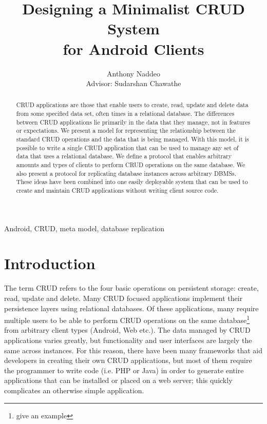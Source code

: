 \documentclass[journal]{IEEEtran}
\begin{document}
\title{Designing a Minimalist CRUD System\\ for Android Clients}
\author{Anthony Naddeo \\ Advisor: Sudarshan Chawathe}

\maketitle


\begin{abstract}
CRUD applications are those that enable users to create, read, update and delete data from some specified data set, often times in a relational database. The differences between CRUD applications lie primarily in the data that they manage, not in features or expectations. We present a model for representing the relationship between the standard CRUD operations and the data that is being managed. With this model, it is possible to write a single CRUD application that can be used to manage any set of data that uses a relational database. We define a protocol that enables arbitrary amounts and types of clients to perform CRUD operations on the same database. We also present a protocol for replicating database instances across arbitrary DBMSs. These ideas have been combined into one easily deployable system that can be used to create and maintain CRUD applications without writing client source code.
\end{abstract}

\begin{IEEEkeywords}
Android, CRUD, meta model, database replication
\end{IEEEkeywords}

\IEEEpeerreviewmaketitle
\tableofcontents

\section{Introduction} \label{sec:intro}



The term CRUD refers to the four basic operations on persistent storage: create, read, update and delete. Many CRUD focused applications implement their persistence layers using relational databases. Of these applications, many require multiple users to be able to perform CRUD operations on the same database\footnote{give an example} from arbitrary client types (Android, Web etc.). The data managed by CRUD applications varies greatly, but functionality and user interfaces are largely the same across instances. For this reason, there have been many frameworks that aid developers in creating their own CRUD applications, but most of them require the programmer to write code (i.e. PHP or Java) in order to generate entire applications that can be installed or placed on a web server; this quickly complicates an otherwise simple application. 
\end{document}
